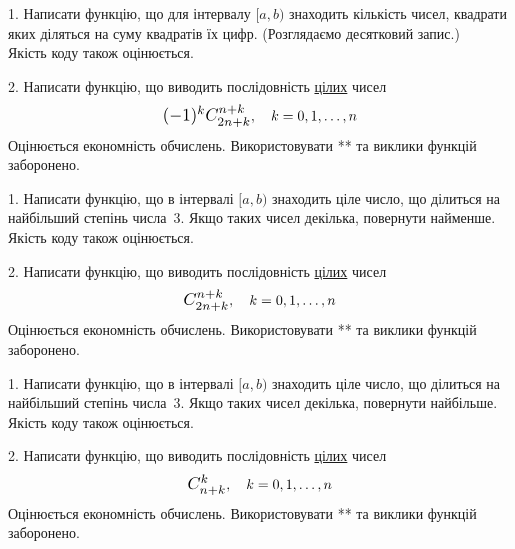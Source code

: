 \documentclass[12pt, ukrainian]{article}
\begin{document}



\begin {Large}
1. Написати функцію, що для інтервалу $[a, b)$ знаходить кількість чисел, квадрати яких діляться на суму квадратів їх цифр. (Розглядаємо десятковий запис.)\\	Якість коду також оцінюється. 



\vspace{10mm}

\newpage

2. 
Написати функцію, що виводить послідовність \underline{цілих} чисел
$$\scalebox{1.2}{$(-1)^{k}C_{2n+k}^{n+k}$}, \quad k=0,1,\ldots,n$$
Оцінюється економність обчислень. Використовувати ** та виклики функцій заборонено.

\end {Large}\newpage




\begin {Large}
1. Написати функцію, що в інтервалі $[a, b)$ знаходить ціле число, що ділиться на найбільший степінь числа 3. Якщо таких чисел декілька, повернути найменше.\\	Якість коду також оцінюється. 



\vspace{10mm}

\newpage

2. 
Написати функцію, що виводить послідовність \underline{цілих} чисел
$$\scalebox{1.2}{$C_{2n+k}^{n+k}$}, \quad k=0,1,\ldots,n$$
Оцінюється економність обчислень. Використовувати ** та виклики функцій заборонено.

\end {Large}\newpage




\begin {Large}
1. Написати функцію, що в інтервалі $[a, b)$ знаходить ціле число, що ділиться на найбільший степінь числа 3. Якщо таких чисел декілька, повернути найбільше.\\	Якість коду також оцінюється. 



\vspace{10mm}

\newpage

2. 
Написати функцію, що виводить послідовність \underline{цілих} чисел
$$\scalebox{1.2}{$C_{n+k}^{k}$}, \quad k=0,1,\ldots,n$$
Оцінюється економність обчислень. Використовувати ** та виклики функцій заборонено.

\end {Large}\newpage
\end{document}
